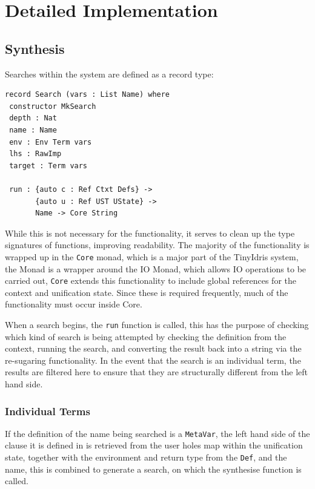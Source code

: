 \documentclass[a4paper]{article}
\begin{document}
\clearpage

\section{Detailed Implementation}

\subsection{Synthesis}
Searches within the system are defined as a record type:

\begin{center}
  \begin{verbatim}
record Search (vars : List Name) where
 constructor MkSearch
 depth : Nat
 name : Name
 env : Env Term vars
 lhs : RawImp
 target : Term vars 

 run : {auto c : Ref Ctxt Defs} -> 
       {auto u : Ref UST UState} ->
       Name -> Core String
  \end{verbatim}
\end{center}

While this is not necessary for the functionality, it serves
to clean up the type signatures of functions, improving readability. 
The majority of the functionality is wrapped up in the \texttt{Core}
monad, which is a major part of the TinyIdris system, the Monad
is a wrapper around the IO Monad, which allows IO operations to be
carried out, \texttt{Core} extends this functionality to include
global references for the context and unification state. Since these
is required frequently, much of the functionality must occur inside
Core. 

When a search begins, the \texttt{run} function is called, this
has the purpose of checking which kind of search is being attempted by
checking the definition from the context, running the search, and
converting the result back into a string via the re-sugaring
functionality. In the event that the search is an individual term,
the results are filtered here to ensure that they are structurally
different from the left hand side.

\subsubsection{Individual Terms}
If the definition of the name being searched is a \texttt{MetaVar},
the left hand side of the clause it is defined in is retrieved from
the user holes map within the unification state, together with the
environment and return type from the \texttt{Def}, and the name,
this is combined to generate a search, on which the synthesise function
is called.
\end{document}
